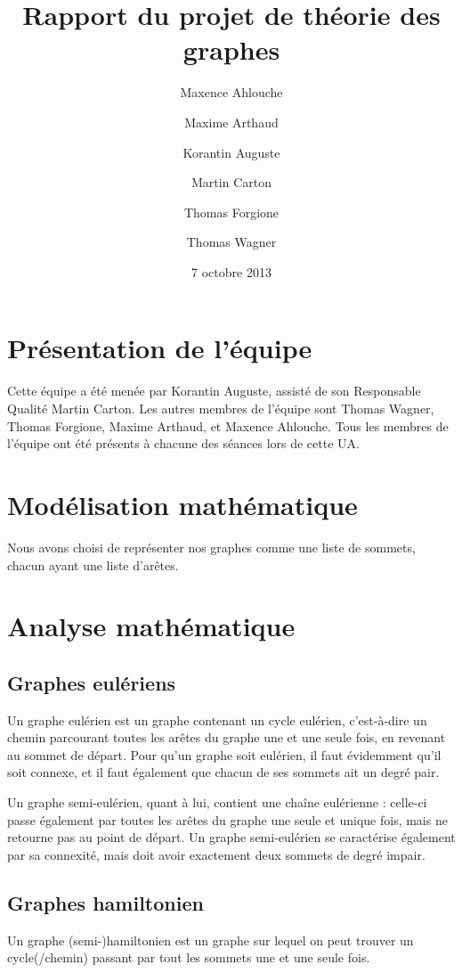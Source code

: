 \documentclass{scrartcl}
\begin{document}
\title{Rapport du projet de théorie des graphes}
\author{Maxence Ahlouche \and Maxime Arthaud \and Korantin Auguste
          \and Martin Carton \and Thomas Forgione \and Thomas Wagner}
\date{7 octobre 2013}
\maketitle
\tableofcontents
\lstlistoflistings
\newpage

\section{Présentation de l'équipe}
  Cette équipe a été menée par Korantin Auguste, assisté de son Responsable
  Qualité Martin Carton. Les autres membres de l'équipe sont Thomas Wagner,
  Thomas Forgione, Maxime Arthaud, et Maxence Ahlouche.  Tous les membres de
  l'équipe ont été présents à chacune des séances lors de cette UA.

\section{Modélisation mathématique}
  Nous avons choisi de représenter nos graphes comme une liste de sommets,
  chacun ayant une liste d'arêtes.

\section{Analyse mathématique}
  \subsection{Graphes eulériens}
    Un graphe eulérien est un graphe contenant un cycle eulérien, c'est-à-dire un chemin parcourant toutes les arêtes du graphe une et une seule fois, en revenant au sommet de départ. Pour qu'un graphe soit eulérien, il faut évidemment qu'il soit connexe, et il faut également que chacun de ses sommets ait un degré pair.

    Un graphe semi-eulérien, quant à lui, contient une chaîne eulérienne : celle-ci passe également par toutes les arêtes du graphe une seule et unique fois, mais ne retourne pas au point de départ. Un graphe semi-eulérien se caractérise également par sa connexité, mais doit avoir exactement deux sommets de degré impair. 

  \subsection{Graphes hamiltonien}
    Un graphe (semi-)hamiltonien est un graphe sur lequel on peut
    trouver un cycle(/chemin) passant par tout les sommets une et une seule
    fois.
\end{document}
